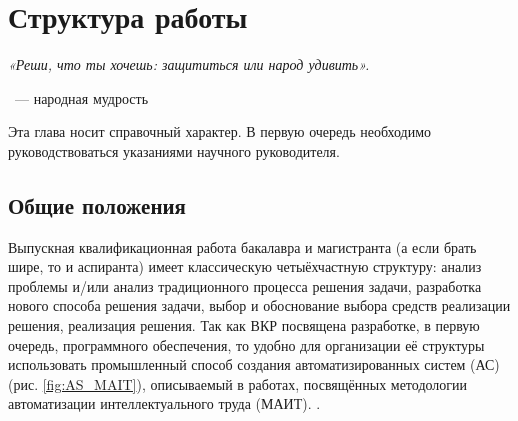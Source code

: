 \section{Структура работы}

\hfill%
\begin{minipage}{0.5\linewidth}
	\textit{«Реши, что ты хочешь: защититься или народ удивить».}
	
	\hfill~--- народная мудрость\strut
\end{minipage}

Эта глава носит справочный характер. В первую очередь необходимо руководствоваться  указаниями научного руководителя. 

\subsection{Общие положения}\label{subsec:aboutwork}

Выпускная квалификационная работа бакалавра и магистранта (а если брать шире, то и аспиранта) имеет классическую четыёхчастную структуру: анализ проблемы и/или анализ традиционного процесса решения задачи, разработка нового способа решения задачи, выбор и обоснование выбора средств реализации решения, реализация решения.
Так как  ВКР посвящена разработке, в первую очередь, программного обеспечения, то удобно для организации её структуры использовать промышленный способ создания автоматизированных систем (АС) (рис. \ref{fig:AS_MAIT}), описываемый в работах, посвящённых методологии автоматизации интеллектуального труда (МАИТ). \cite{gd:nm}.   

